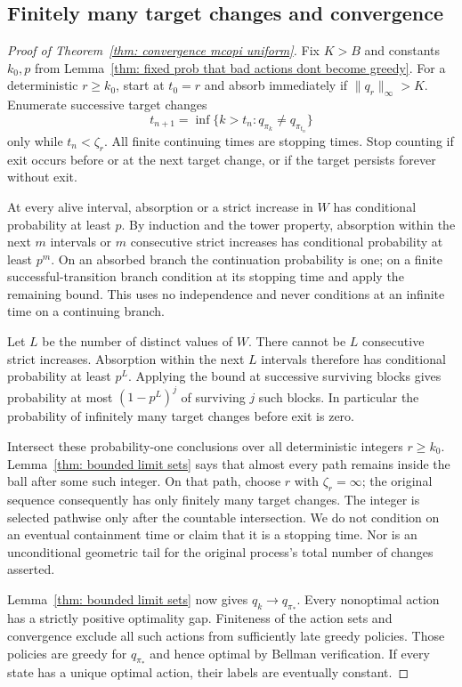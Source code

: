 \subsection{Finitely many target changes and convergence}
\begin{proof}[Proof of Theorem~\ref{thm: convergence mcopi uniform}]
Fix $K>B$ and constants $k_0,p$ from Lemma~\ref{thm: fixed prob that bad actions dont become greedy}. For a deterministic
$r\ge k_0$, start at $t_0=r$ and absorb immediately if $\|q_r\|_\infty>K$. Enumerate successive target
changes
\[
t_{n+1}=\inf\{k>t_n:q_{\pi_k}\ne q_{\pi_{t_n}}\}
\]
only while $t_n<\zeta_r$. All finite continuing times are stopping times. Stop counting if exit
occurs before or at the next target change, or if the target persists forever without exit.

At every alive interval, absorption or a strict increase in $W$ has conditional probability
at least $p$. By induction and the tower property, absorption within the next $m$ intervals
or $m$ consecutive strict increases has conditional probability at least $p^m$. On an absorbed
branch the continuation probability is one; on a finite successful-transition branch condition
at its stopping time and apply the remaining bound. This uses no independence and never
conditions at an infinite time on a continuing branch.

Let $L$ be the number of distinct values of $W$. There cannot be $L$ consecutive strict
increases. Absorption within the next $L$ intervals therefore has conditional probability at least
$p^L$. Applying the bound at successive surviving blocks gives probability at most $(1-p^L)^j$
of surviving $j$ such blocks. In particular the probability of infinitely many target changes
before exit is zero.

Intersect these probability-one conclusions over all deterministic integers $r\ge k_0$. Lemma~\ref{thm: bounded limit sets}
says that almost every path remains inside the ball after some such integer. On that path,
choose $r$ with $\zeta_r=\infty$; the original sequence consequently has only finitely many target
changes. The integer is selected pathwise only after the countable intersection. We do not
condition on an eventual containment time or claim that it is a stopping time. Nor is an
unconditional geometric tail for the original process's total number of changes asserted.

Lemma~\ref{thm: bounded limit sets} now gives $q_k\to q_{\pi_*}$. Every nonoptimal action has a strictly positive optimality
gap. Finiteness of the action sets and convergence exclude all such actions from sufficiently
late greedy policies. Those policies are greedy for $q_{\pi_*}$ and hence optimal by Bellman verification.
If every state has a unique optimal action, their labels are eventually constant.
\end{proof}
